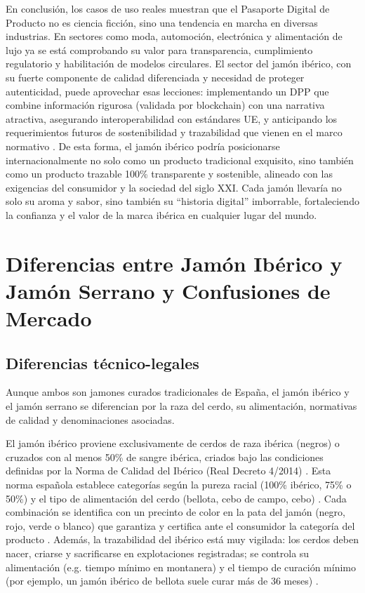 En conclusión, los casos de uso reales muestran que el Pasaporte Digital de Producto no es ciencia ficción, sino una tendencia en marcha en diversas industrias. En sectores como moda, automoción, electrónica y alimentación de lujo ya se está comprobando su valor para transparencia, cumplimiento regulatorio y habilitación de modelos circulares. El sector del jamón ibérico, con su fuerte componente de calidad diferenciada y necesidad de proteger autenticidad, puede aprovechar esas lecciones: implementando un DPP que combine información rigurosa (validada por blockchain) con una narrativa atractiva, asegurando interoperabilidad con estándares UE, y anticipando los requerimientos futuros de sostenibilidad y trazabilidad que vienen en el marco normativo \cite{noauthor_digital_nodate-1}. De esta forma, el jamón ibérico podría posicionarse internacionalmente no solo como un producto tradicional exquisito, sino también como un producto trazable 100\% transparente y sostenible, alineado con las exigencias del consumidor y la sociedad del siglo XXI. Cada jamón llevaría no solo su aroma y sabor, sino también su “historia digital” imborrable, fortaleciendo la confianza y el valor de la marca ibérica en cualquier lugar del mundo.

\section{Diferencias entre Jamón Ibérico y Jamón Serrano y Confusiones de Mercado}\label{sec:intro-diferencias}

\subsection{Diferencias técnico-legales}
Aunque ambos son jamones curados tradicionales de España, el jamón ibérico y el jamón serrano se diferencian por la raza del cerdo, su alimentación, normativas de calidad y denominaciones asociadas.

El jamón ibérico proviene exclusivamente de cerdos de raza ibérica (negros) o cruzados con al menos 50\% de sangre ibérica, criados bajo las condiciones definidas por la Norma de Calidad del Ibérico (Real Decreto 4/2014) \cite{ministerio_de_agricultura_alimentacion_y_medio_ambiente_real_2014}. Esta norma española establece categorías según la pureza racial (100\% ibérico, 75\% o 50\%) y el tipo de alimentación del cerdo (bellota, cebo de campo, cebo) \cite{noauthor_precintos_nodate}. Cada combinación se identifica con un precinto de color en la pata del jamón (negro, rojo, verde o blanco) que garantiza y certifica ante el consumidor la categoría del producto \cite{noauthor_precintos_nodate}. Además, la trazabilidad del ibérico está muy vigilada: los cerdos deben nacer, criarse y sacrificarse en explotaciones registradas; se controla su alimentación (e.g. tiempo mínimo en montanera) y el tiempo de curación mínimo (por ejemplo, un jamón ibérico de bellota suele curar más de 36 meses) \cite{ministerio_de_agricultura_alimentacion_y_medio_ambiente_real_2014}.

